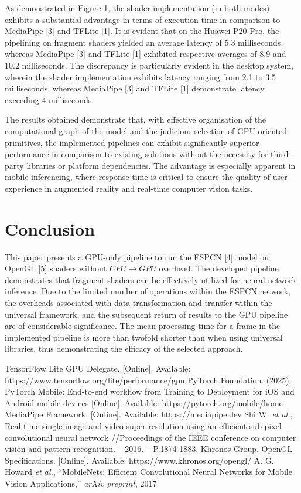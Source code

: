 \documentclass[conference]{IEEEtran}
\begin{document}
As demonstrated in Figure 1, the shader implementation (in both modes) exhibits a substantial advantage in terms of execution time in comparison to MediaPipe [3] and TFLite [1]. It is evident that on the Huawei P20 Pro, the pipelining on fragment shaders yielded an average latency of 5.3 milliseconds, whereas MediaPipe [3] and TFLite [1] exhibited respective averages of 8.9 and 10.2 milliseconds. The discrepancy is particularly evident in the desktop system, wherein the shader implementation exhibits latency ranging from 2.1 to 3.5 milliseconds, whereas MediaPipe [3] and TFLite [1] demonstrate latency exceeding 4 milliseconds.
            
The results obtained demonstrate that, with effective organisation of the computational graph of the model and the judicious selection of GPU-oriented primitives, the implemented pipelines can exhibit significantly superior performance in comparison to existing solutions without the necessity for third-party libraries or platform dependencies. The advantage is especially apparent in mobile inferencing, where response time is critical to ensure the quality of user experience in augmented reality and real-time computer vision tasks.

\section{Conclusion}
This paper presents a GPU-only pipeline to run the ESPCN [4] model on OpenGL [5] shaders without $CPU \xrightarrow{} GPU$ overhead. The developed pipeline demonstrates that fragment shaders can be effectively utilized for neural network inference. Due to the limited number of operations within the ESPCN network, the overheads associated with data transformation and transfer within the universal framework, and the subsequent return of results to the GPU pipeline are of considerable significance. The mean processing time for a frame in the implemented pipeline is more than twofold shorter than when using universal libraries, thus demonstrating the efficacy of the selected approach.

\begin{thebibliography}{00}
 TensorFlow Lite GPU Delegate. [Online]. Available: https://www.tensorflow.org/lite/performance/gpu
 PyTorch Foundation. (2025). PyTorch Mobile: End-to-end workflow from Training to Deployment for iOS and Android mobile devices [Online]. Available: https://pytorch.org/mobile/home
 MediaPipe Framework. [Online]. Available: https://mediapipe.dev
 Shi W. \textit{et al.}, Real-time single image and video super-resolution using an efficient sub-pixel convolutional neural network //Proceedings of the IEEE conference on computer vision and pattern recognition. – 2016. – P.1874-1883.
 Khronos Group. OpenGL Specifications. [Online]. Available: https://www.khronos.org/opengl/
 A. G. Howard \textit{et al.}, “MobileNets: Efficient Convolutional Neural Networks for Mobile Vision Applications,” \textit{arXiv preprint}, 2017.
\end{thebibliography}
\end{document}
